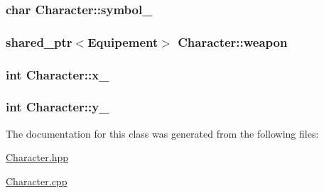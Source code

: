 \hypertarget{classCharacter_af3b304ea19adc493b2daa9bd1e80229d}{
\subsubsection[{symbol\-\_\-}]{\setlength{\rightskip}{0pt plus 5cm}char Character\-::symbol\-\_\-\hspace{0.3cm}{\ttfamily [protected]}}}\label{classCharacter_af3b304ea19adc493b2daa9bd1e80229d}
\hypertarget{classCharacter_af779f72e2ccbc275350ab80b99136c7c}{
\subsubsection[{weapon}]{\setlength{\rightskip}{0pt plus 5cm}shared\-\_\-ptr$<${\bf Equipement}$>$ Character\-::weapon\hspace{0.3cm}{\ttfamily [protected]}}}\label{classCharacter_af779f72e2ccbc275350ab80b99136c7c}
\hypertarget{classCharacter_af0ed42181b8730437905b21485879471}{
\subsubsection[{x\-\_\-}]{\setlength{\rightskip}{0pt plus 5cm}int Character\-::x\-\_\-\hspace{0.3cm}{\ttfamily [protected]}}}\label{classCharacter_af0ed42181b8730437905b21485879471}
\hypertarget{classCharacter_aeda4757626cbc50f408dc93eb541a831}{
\subsubsection[{y\-\_\-}]{\setlength{\rightskip}{0pt plus 5cm}int Character\-::y\-\_\-\hspace{0.3cm}{\ttfamily [protected]}}}\label{classCharacter_aeda4757626cbc50f408dc93eb541a831}


The documentation for this class was generated from the following files\-:\begin{DoxyCompactItemize}
\item 
\hyperlink{Character_8hpp}{Character.\-hpp}\item 
\hyperlink{Character_8cpp}{Character.\-cpp}\end{DoxyCompactItemize}
